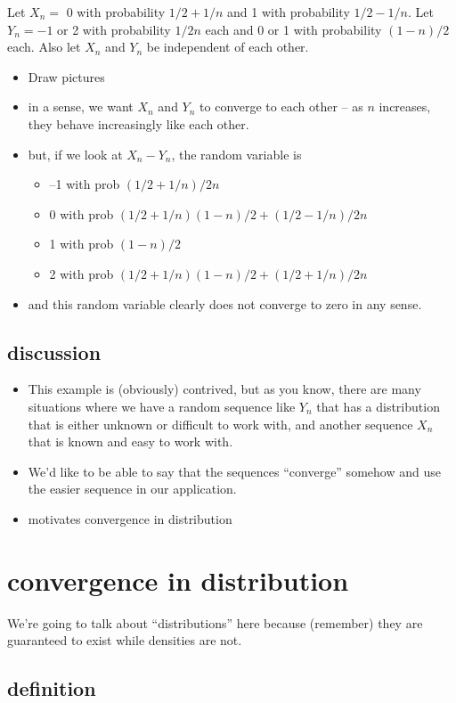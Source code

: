      Let $X_n =$ 0 with probability $1/2 + 1/n$ and 1 with probability
     $1/2 - 1/n$.  Let $Y_n = - 1$ or 2 with probability $1/2n$ each and
     0 or 1 with probability $(1-n)/2$ each.  Also let $X_n$ and $Y_n$
     be independent of each other.
\begin{itemize}
\item Draw pictures
\item in a sense, we want $X_n$ and $Y_n$ to converge to each other --
       as $n$ increases, they behave increasingly like each other.
\item but, if we look at $X_n - Y_n$, the random variable is
\begin{itemize}
\item --1 with prob $(1/2 + 1/n)/2n$
\item 0 with prob $(1/2 + 1/n)(1 - n)/2 + (1/2-1/n)/2n$
\item 1 with prob $(1 - n)/2$
\item 2 with prob $(1/2 + 1/n)(1-n)/2 + (1/2+1/n)/2n$
\end{itemize}
\item and this random variable clearly does not converge to zero in any
       sense.
\end{itemize}
\subsection{discussion}
\label{sec-1-2}

\begin{itemize}
\item This example is (obviously) contrived, but as you know, there are
       many situations where we have a random sequence like $Y_n$ that
       has a distribution that is either unknown or difficult to work
       with, and another sequence $X_n$ that is known and easy to work
       with.
\item We'd like to be able to say that the sequences ``converge'' somehow
       and use the easier sequence in our application.
\item motivates convergence in distribution
\end{itemize}
\section{convergence in distribution}
\label{sec-2}

    We're going to talk about ``distributions'' here because (remember)
    they are guaranteed to exist while densities are not.
\subsection{definition}
\label{sec-2-1}

